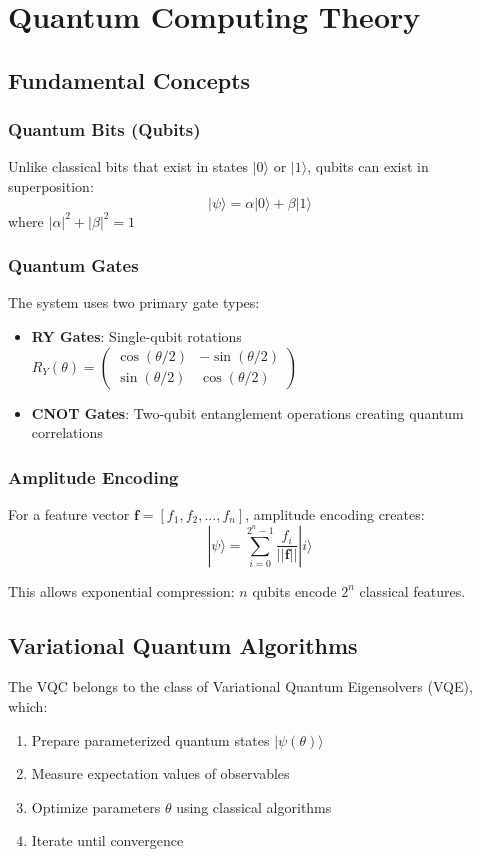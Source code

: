 \documentclass[11pt,a4paper]{article}
\begin{document}
\section{Quantum Computing Theory}

\subsection{Fundamental Concepts}

\subsubsection{Quantum Bits (Qubits)}
Unlike classical bits that exist in states $|0\rangle$ or $|1\rangle$, qubits can exist in superposition:
$$|\psi\rangle = \alpha|0\rangle + \beta|1\rangle$$
where $|\alpha|^2 + |\beta|^2 = 1$

\subsubsection{Quantum Gates}
The system uses two primary gate types:
\begin{itemize}
    \item \textbf{RY Gates}: Single-qubit rotations $R_Y(\theta) = \begin{pmatrix} \cos(\theta/2) & -\sin(\theta/2) \\ \sin(\theta/2) & \cos(\theta/2) \end{pmatrix}$
    \item \textbf{CNOT Gates}: Two-qubit entanglement operations creating quantum correlations
\end{itemize}

\subsubsection{Amplitude Encoding}
For a feature vector $\mathbf{f} = [f_1, f_2, ..., f_n]$, amplitude encoding creates:
$$|\psi\rangle = \sum_{i=0}^{2^n-1} \frac{f_i}{||\mathbf{f}||} |i\rangle$$

This allows exponential compression: $n$ qubits encode $2^n$ classical features.

\subsection{Variational Quantum Algorithms}

The VQC belongs to the class of Variational Quantum Eigensolvers (VQE), which:
\begin{enumerate}
    \item Prepare parameterized quantum states $|\psi(\theta)\rangle$
    \item Measure expectation values of observables
    \item Optimize parameters $\theta$ using classical algorithms
    \item Iterate until convergence
\end{enumerate}
\end{document}
